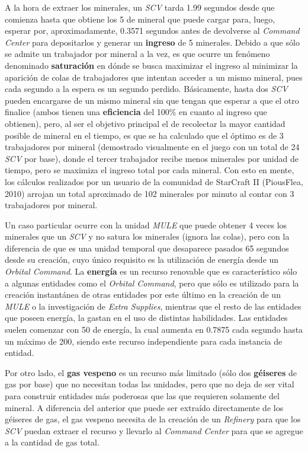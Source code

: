 A la hora de extraer los minerales, un \textit{SCV} tarda 1.99 segundos desde que comienza hasta que obtiene los 5 de mineral que puede cargar para, luego, esperar por, aproximadamente, 0.3571 segundos antes de devolverse al \textit{Command Center} para depositarlos y generar un \textbf{ingreso} de 5 minerales. Debido a que sólo se admite un trabajador por mineral a la vez, es que ocurre un fenómeno denominado \textbf{saturación} en dónde se busca maximizar el ingreso al minimizar la aparición de colas de trabajadores que intentan acceder a un mismo mineral, pues cada segundo a la espera es un segundo perdido. Básicamente, hasta dos \textit{SCV} pueden encargarse de un mismo mineral sin que tengan que esperar a que el otro finalice (ambos tienen una \textbf{eficiencia} del 100\% en cuanto al ingreso que obtienen), pero, al ser el objetivo principal el de recolectar la mayor cantidad posible de mineral en el tiempo, es que se ha calculado que el óptimo es de 3 trabajadores por mineral (demostrado visualmente en el juego con un total de 24 \textit{SCV} por base), donde el tercer trabajador recibe menos minerales por unidad de tiempo, pero se maximiza el ingreso total por cada mineral. Con esto en mente, los cálculos realizados por un usuario de la comunidad de StarCraft II (PiousFlea, 2010) arrojan un total aproximado de 102 minerales por minuto al contar con 3 trabajadores por mineral.

Un caso particular ocurre con la unidad \textit{MULE} que puede obtener 4 veces los minerales que un \textit{SCV} y no satura los minerales (ignora las colas), pero con la diferencia de que es una unidad temporal que desaparece pasados 65 segundos desde su creación, cuyo único requisito es la utilización de energía desde un \textit{Orbital Command}. La \textbf{energía} es un recurso renovable que es característico sólo a algunas entidades como el \textit{Orbital Command}, pero que sólo es utilizado para la creación instantánea de otras entidades por este último en la creación de un \textit{MULE} o la investigación de \textit{Extra Supplies}, mientras que el resto de las entidades que poseen energía, la gastan en el uso de distintas habilidades. Las entidades suelen comenzar con 50 de energía, la cual aumenta en 0.7875 cada segundo hasta un máximo de 200, siendo este recurso independiente para cada instancia de entidad.

Por otro lado, el \textbf{gas vespeno} es un recurso más limitado (sólo dos \textbf{géiseres} de gas por base) que no necesitan todas las unidades, pero que no deja de ser vital para construir entidades más poderosas que las que requieren solamente del mineral. A diferencia del anterior que puede ser extraído directamente de los géiseres de gas, el gas vespeno necesita de la creación de un \textit{Refinery} para que los \textit{SCV} puedan extraer el recurso y llevarlo al \textit{Command Center} para que se agregue a la cantidad de gas total.

